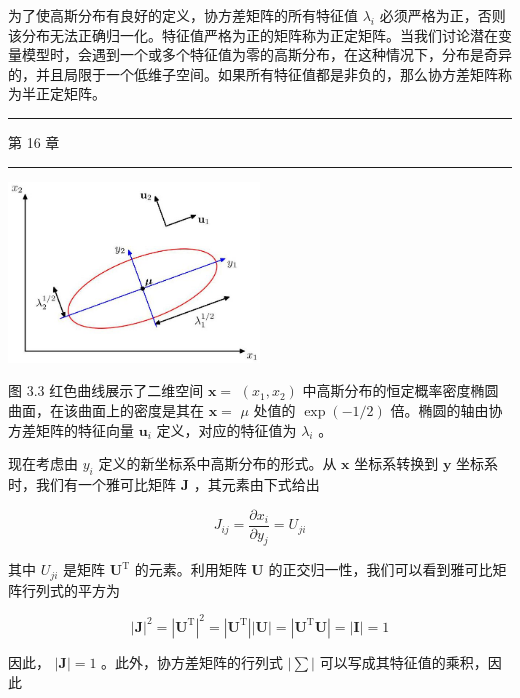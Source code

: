 \documentclass[10pt]{article}
\newcommand{\HRule}{\begin{center}\rule{0.9\linewidth}{0.2mm}\end{center}}
\begin{document}
为了使高斯分布有良好的定义，协方差矩阵的所有特征值 \({\lambda }_{i}\) 必须严格为正，否则该分布无法正确归一化。特征值严格为正的矩阵称为正定矩阵。当我们讨论潜在变量模型时，会遇到一个或多个特征值为零的高斯分布，在这种情况下，分布是奇异的，并且局限于一个低维子空间。如果所有特征值都是非负的，那么协方差矩阵称为半正定矩阵。

\HRule

第 16 章

\HRule

\begin{center}
\includegraphics[max width=0.5\textwidth]{images/0194e279-9b28-703a-88f4-c3ac21e2010d_92_854_346_691_497_0.jpg}
\end{center}
\hspace*{3em} 

图 3.3 红色曲线展示了二维空间 \(\mathbf{x} =\)  \(\left( {{x}_{1},{x}_{2}}\right)\) 中高斯分布的恒定概率密度椭圆曲面，在该曲面上的密度是其在 \(\mathbf{x} =\)  \(\mu\) 处值的 \(\exp \left( {-1/2}\right)\) 倍。椭圆的轴由协方差矩阵的特征向量 \({\mathbf{u}}_{i}\) 定义，对应的特征值为 \({\lambda }_{i}\) 。

现在考虑由 \({y}_{i}\) 定义的新坐标系中高斯分布的形式。从 \(\mathbf{x}\) 坐标系转换到 \(\mathbf{y}\) 坐标系时，我们有一个雅可比矩阵 \(\mathbf{J}\) ，其元素由下式给出

\[
{J}_{ij} = \frac{\partial {x}_{i}}{\partial {y}_{j}} = {U}_{ji} \tag{3.36}
\]

其中 \({U}_{ji}\) 是矩阵 \({\mathbf{U}}^{\mathrm{T}}\) 的元素。利用矩阵 \(\mathbf{U}\) 的正交归一性，我们可以看到雅可比矩阵行列式的平方为

\[
{\left| \mathbf{J}\right| }^{2} = {\left| {\mathbf{U}}^{\mathrm{T}}\right| }^{2} = \left| {\mathbf{U}}^{\mathrm{T}}\right| \left| \mathbf{U}\right|  = \left| {{\mathbf{U}}^{\mathrm{T}}\mathbf{U}}\right|  = \left| \mathbf{I}\right|  = 1 \tag{3.37}
\]

因此， \(\left| \mathbf{J}\right|  = 1\) 。此外，协方差矩阵的行列式 \(\left| \mathbf{\sum }\right|\) 可以写成其特征值的乘积，因此
\end{document}
